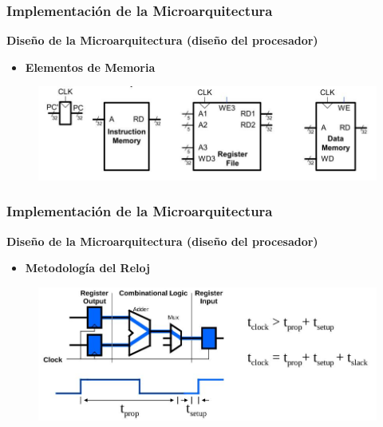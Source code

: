 \documentclass[aspectratio=169,compress]{beamer}
\begin{document}
\begin{footnotesize}
\begin{frame}
\end{frame}




\begin{frame}
\frametitle{Implementación de la Microarquitectura}
\begin{center}\textbf{Diseño de la Microarquitectura (diseño del procesador)}\end{center}
\begin{itemize}
\item \textbf{Elementos de Memoria}
\end{itemize}

\begin{figure}
\includegraphics[scale=0.4]{images/elementos-de-estado.jpg} 
\end{figure}

\end{frame}



\begin{frame}
\frametitle{Implementación de la Microarquitectura}
\begin{center}\textbf{Diseño de la Microarquitectura (diseño del procesador)}\end{center}
\begin{itemize}
\item \textbf{Metodología del Reloj}
\end{itemize}

\begin{figure}
\includegraphics[scale=0.4]{images/reloj.jpg} 
\end{figure}


\end{frame}
\end{footnotesize}
\end{document}
